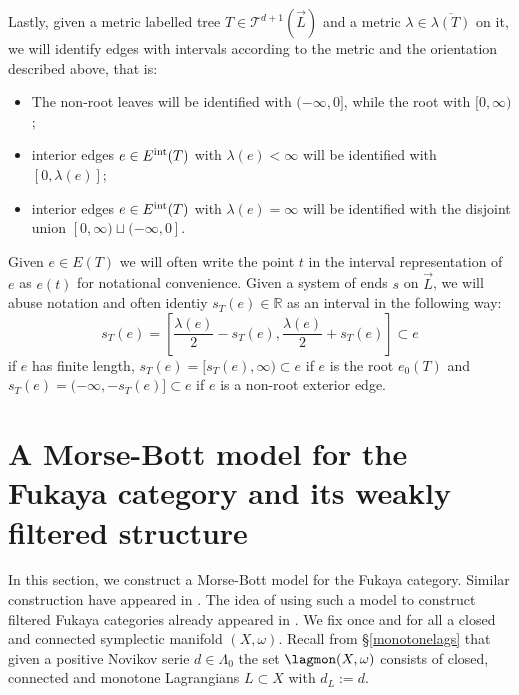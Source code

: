 Lastly, given a metric labelled tree $T\in \mathcal{T}^{d+1}(\vec{L})$ and a metric $\lambda\in \overline{\lambda(T)}$ on it, we will identify edges with intervals according to the metric and the orientation described above, that is:
\begin{itemize}
	\item The non-root leaves will be identified with $(-\infty,0]$, while the root with $[0,\infty)$;
	\item interior edges $e\in E^\textnormal{int}(T)$ with $\lambda(e)<\infty$ will be identified with $[0,\lambda(e)]$;
	\item interior edges $e\in E^\textnormal{int}(T)$ with $\lambda(e)=\infty$ will be identified with the disjoint union $[0,\infty)\sqcup(-\infty,0]$.
\end{itemize}
Given $e\in E(T)$ we will often write the point $t$ in the interval representation of $e$ as $e(t)$ for notational convenience. Given a system of ends $s$ on $\vec{L}$, we will abuse notation and often identiy $s_T(e)\in \mathbb R$ as an interval in the following way: $$s_T(e) = \left[\frac{\lambda(e)}{2}-s_T(e), \frac{\lambda(e)}{2}+s_T(e)\right]\subset e$$ if $e$ has finite length, $s_T(e) = [s_T(e), \infty)\subset e$ if $e$ is the root $e_0(T)$ and $s_T(e)=(-\infty, -s_T(e)]\subset e$ if $e$ is a non-root exterior edge.


\section{A Morse-Bott model for the Fukaya category and its weakly filtered structure}\label{mbfuk}
In this section, we construct a Morse-Bott model for the Fukaya category. Similar construction have appeared in \cite{Cor-La:Cluster-2, Sheridan2011OnPants, Charest2012SourceComplexes}. The idea of using such a model to construct filtered Fukaya categories already appeared in \cite{BCZ:tpc}. We fix once and for all a closed and connected symplectic manifold $(X,\omega)$. Recall from \S \ref{monotonelags} that given a positive Novikov serie $d\in \Lambda_0$ the set $\lagmon(X,\omega)$ consists of closed, connected and monotone Lagrangians $L\subset X$ with $d_L:=d$.




